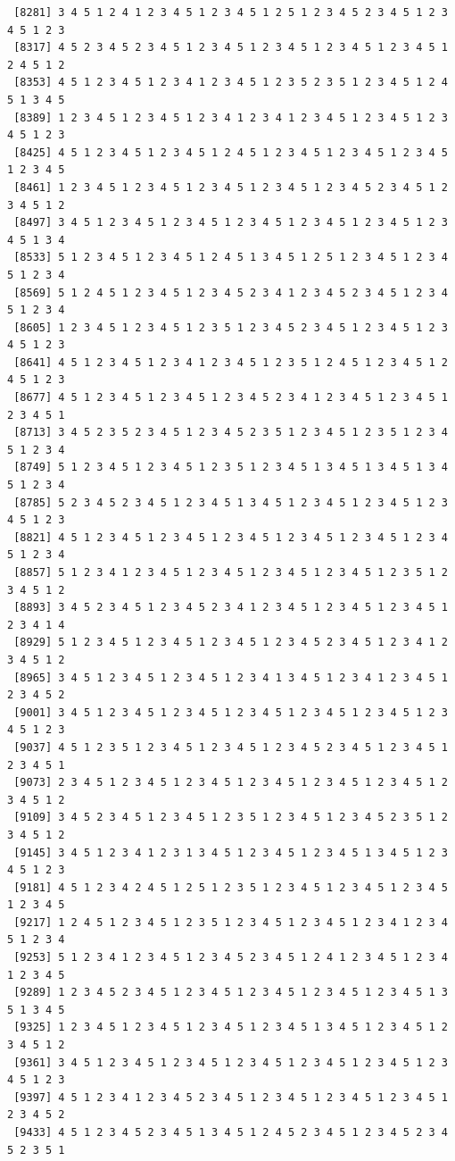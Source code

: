 \documentclass[
  english,
]{book}
\begin{document}
\begin{verbatim}
 [8281] 3 4 5 1 2 4 1 2 3 4 5 1 2 3 4 5 1 2 5 1 2 3 4 5 2 3 4 5 1 2 3 4 5 1 2 3
 [8317] 4 5 2 3 4 5 2 3 4 5 1 2 3 4 5 1 2 3 4 5 1 2 3 4 5 1 2 3 4 5 1 2 4 5 1 2
 [8353] 4 5 1 2 3 4 5 1 2 3 4 1 2 3 4 5 1 2 3 5 2 3 5 1 2 3 4 5 1 2 4 5 1 3 4 5
 [8389] 1 2 3 4 5 1 2 3 4 5 1 2 3 4 1 2 3 4 1 2 3 4 5 1 2 3 4 5 1 2 3 4 5 1 2 3
 [8425] 4 5 1 2 3 4 5 1 2 3 4 5 1 2 4 5 1 2 3 4 5 1 2 3 4 5 1 2 3 4 5 1 2 3 4 5
 [8461] 1 2 3 4 5 1 2 3 4 5 1 2 3 4 5 1 2 3 4 5 1 2 3 4 5 2 3 4 5 1 2 3 4 5 1 2
 [8497] 3 4 5 1 2 3 4 5 1 2 3 4 5 1 2 3 4 5 1 2 3 4 5 1 2 3 4 5 1 2 3 4 5 1 3 4
 [8533] 5 1 2 3 4 5 1 2 3 4 5 1 2 4 5 1 3 4 5 1 2 5 1 2 3 4 5 1 2 3 4 5 1 2 3 4
 [8569] 5 1 2 4 5 1 2 3 4 5 1 2 3 4 5 2 3 4 1 2 3 4 5 2 3 4 5 1 2 3 4 5 1 2 3 4
 [8605] 1 2 3 4 5 1 2 3 4 5 1 2 3 5 1 2 3 4 5 2 3 4 5 1 2 3 4 5 1 2 3 4 5 1 2 3
 [8641] 4 5 1 2 3 4 5 1 2 3 4 1 2 3 4 5 1 2 3 5 1 2 4 5 1 2 3 4 5 1 2 4 5 1 2 3
 [8677] 4 5 1 2 3 4 5 1 2 3 4 5 1 2 3 4 5 2 3 4 1 2 3 4 5 1 2 3 4 5 1 2 3 4 5 1
 [8713] 3 4 5 2 3 5 2 3 4 5 1 2 3 4 5 2 3 5 1 2 3 4 5 1 2 3 5 1 2 3 4 5 1 2 3 4
 [8749] 5 1 2 3 4 5 1 2 3 4 5 1 2 3 5 1 2 3 4 5 1 3 4 5 1 3 4 5 1 3 4 5 1 2 3 4
 [8785] 5 2 3 4 5 2 3 4 5 1 2 3 4 5 1 3 4 5 1 2 3 4 5 1 2 3 4 5 1 2 3 4 5 1 2 3
 [8821] 4 5 1 2 3 4 5 1 2 3 4 5 1 2 3 4 5 1 2 3 4 5 1 2 3 4 5 1 2 3 4 5 1 2 3 4
 [8857] 5 1 2 3 4 1 2 3 4 5 1 2 3 4 5 1 2 3 4 5 1 2 3 4 5 1 2 3 5 1 2 3 4 5 1 2
 [8893] 3 4 5 2 3 4 5 1 2 3 4 5 2 3 4 1 2 3 4 5 1 2 3 4 5 1 2 3 4 5 1 2 3 4 1 4
 [8929] 5 1 2 3 4 5 1 2 3 4 5 1 2 3 4 5 1 2 3 4 5 2 3 4 5 1 2 3 4 1 2 3 4 5 1 2
 [8965] 3 4 5 1 2 3 4 5 1 2 3 4 5 1 2 3 4 1 3 4 5 1 2 3 4 1 2 3 4 5 1 2 3 4 5 2
 [9001] 3 4 5 1 2 3 4 5 1 2 3 4 5 1 2 3 4 5 1 2 3 4 5 1 2 3 4 5 1 2 3 4 5 1 2 3
 [9037] 4 5 1 2 3 5 1 2 3 4 5 1 2 3 4 5 1 2 3 4 5 2 3 4 5 1 2 3 4 5 1 2 3 4 5 1
 [9073] 2 3 4 5 1 2 3 4 5 1 2 3 4 5 1 2 3 4 5 1 2 3 4 5 1 2 3 4 5 1 2 3 4 5 1 2
 [9109] 3 4 5 2 3 4 5 1 2 3 4 5 1 2 3 5 1 2 3 4 5 1 2 3 4 5 2 3 5 1 2 3 4 5 1 2
 [9145] 3 4 5 1 2 3 4 1 2 3 1 3 4 5 1 2 3 4 5 1 2 3 4 5 1 3 4 5 1 2 3 4 5 1 2 3
 [9181] 4 5 1 2 3 4 2 4 5 1 2 5 1 2 3 5 1 2 3 4 5 1 2 3 4 5 1 2 3 4 5 1 2 3 4 5
 [9217] 1 2 4 5 1 2 3 4 5 1 2 3 5 1 2 3 4 5 1 2 3 4 5 1 2 3 4 1 2 3 4 5 1 2 3 4
 [9253] 5 1 2 3 4 1 2 3 4 5 1 2 3 4 5 2 3 4 5 1 2 4 1 2 3 4 5 1 2 3 4 1 2 3 4 5
 [9289] 1 2 3 4 5 2 3 4 5 1 2 3 4 5 1 2 3 4 5 1 2 3 4 5 1 2 3 4 5 1 3 5 1 3 4 5
 [9325] 1 2 3 4 5 1 2 3 4 5 1 2 3 4 5 1 2 3 4 5 1 3 4 5 1 2 3 4 5 1 2 3 4 5 1 2
 [9361] 3 4 5 1 2 3 4 5 1 2 3 4 5 1 2 3 4 5 1 2 3 4 5 1 2 3 4 5 1 2 3 4 5 1 2 3
 [9397] 4 5 1 2 3 4 1 2 3 4 5 2 3 4 5 1 2 3 4 5 1 2 3 4 5 1 2 3 4 5 1 2 3 4 5 2
 [9433] 4 5 1 2 3 4 5 2 3 4 5 1 3 4 5 1 2 4 5 2 3 4 5 1 2 3 4 5 2 3 4 5 2 3 5 1

\end{verbatim}
\end{document}
